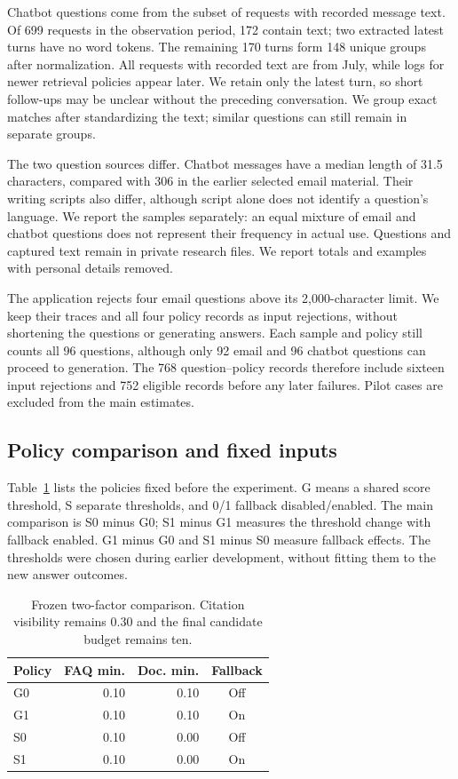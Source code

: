 \documentclass[a4paper,10pt,twocolumn]{article}
\begin{document}
Chatbot questions come from the subset of requests with recorded message text. Of 699 requests in the observation period, 172 contain text; two extracted latest turns have no word tokens. The remaining 170 turns form 148 unique groups after normalization. All requests with recorded text are from July, while logs for newer retrieval policies appear later. We retain only the latest turn, so short follow-ups may be unclear without the preceding conversation. We group exact matches after standardizing the text; similar questions can still remain in separate groups.

The two question sources differ. Chatbot messages have a median length of 31.5 characters, compared with 306 in the earlier selected email material. Their writing scripts also differ, although script alone does not identify a question's language. We report the samples separately: an equal mixture of email and chatbot questions does not represent their frequency in actual use. Questions and captured text remain in private research files. We report totals and examples with personal details removed.

The application rejects four email questions above its 2,000-character limit. We keep their traces and all four policy records as input rejections, without shortening the questions or generating answers. Each sample and policy still counts all 96 questions, although only 92 email and 96 chatbot questions can proceed to generation. The 768 question--policy records therefore include sixteen input rejections and 752 eligible records before any later failures. Pilot cases are excluded from the main estimates.

\subsection{Policy comparison and fixed inputs}
Table~\ref{tab:factorial} lists the policies fixed before the experiment. G means a shared score threshold, S separate thresholds, and 0/1 fallback disabled/enabled. The main comparison is S0 minus G0; S1 minus G1 measures the threshold change with fallback enabled. G1 minus G0 and S1 minus S0 measure fallback effects. The thresholds were chosen during earlier development, without fitting them to the new answer outcomes.

\begin{table}[t]
\centering\small
\caption{Frozen two-factor comparison. Citation visibility remains 0.30 and the final candidate budget remains ten.}\label{tab:factorial}
\begin{tabular}{lrrc}
\toprule
Policy & FAQ min. & Doc. min. & Fallback\\
\midrule
G0 & 0.10 & 0.10 & Off\\
G1 & 0.10 & 0.10 & On\\
S0 & 0.10 & 0.00 & Off\\
S1 & 0.10 & 0.00 & On\\
\bottomrule
\end{tabular}
\end{table}
\end{document}

